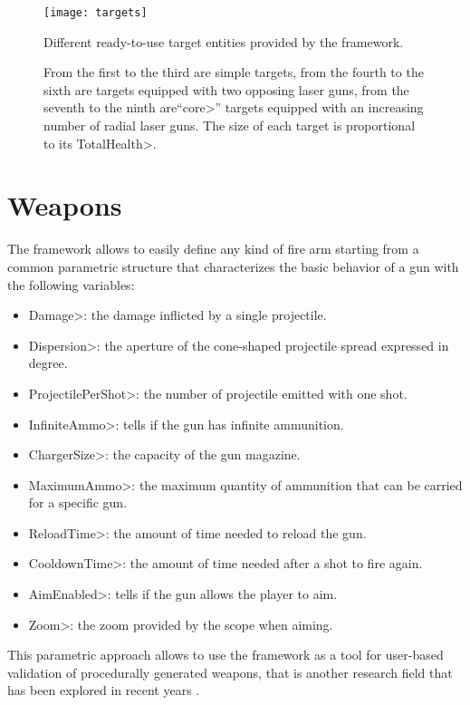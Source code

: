 \begin{figure}
\centering
\texttt{[image: targets]}
\caption{Different ready-to-use target entities provided by the framework.}
\caption*{From the first to the third are simple targets, from the fourth to the sixth are targets equipped with two opposing laser guns, from the seventh to the ninth are``\<core>'' targets equipped with an increasing number of radial laser guns. The size of each target is proportional to its \<TotalHealth>.}
\label{fig:targets}
\end{figure}


\section{Weapons}

The framework allows to easily define any kind of fire arm starting from a common parametric structure that characterizes the basic behavior of a gun with the following variables: 

\begin{itemize}
\item \<Damage>: the damage inflicted by a single projectile.
\item \<Dispersion>: the aperture of the cone-shaped projectile spread expressed in degree.
\item \<ProjectilePerShot>: the number of projectile emitted with one shot.
\item \<InfiniteAmmo>: tells if the gun has infinite ammunition.
\item \<ChargerSize>: the capacity of the gun magazine.
\item \<MaximumAmmo>: the maximum quantity of ammunition that can be carried for a specific gun.
\item \<ReloadTime>: the amount of time needed to reload the gun.
\item \<CooldownTime>:  the amount of time needed after a shot to fire again.
\item \<AimEnabled>: tells if the gun allows the player to aim.
\item \<Zoom>: the zoom provided by the scope when aiming.
\end{itemize}

\noindent This parametric approach allows to use the framework as a tool for user-based validation of procedurally generated weapons, that is another research field that has been explored in recent years \cite{ArmiProcedurali}.


